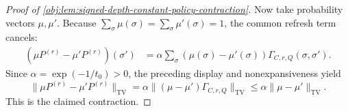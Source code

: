 \begin{proof}[Proof of \cref{obj:lem:signed-depth-constant-policy-contraction}]
Now take probability vectors \(\mu,\mu'\). Because \(\sum_\sigma\mu(\sigma)=\sum_\sigma\mu'(\sigma)=1\), the common refresh term cancels:
\[
\begin{aligned}
(\mu P^{(r)}-\mu'P^{(r)})(\sigma')
&=
\alpha\sum_{\sigma}
(\mu(\sigma)-\mu'(\sigma))\Gamma_{C,r,Q}(\sigma,\sigma') .
\end{aligned}
\]
Since \(\alpha=\exp(-1/t_0)>0\), the preceding display and nonexpansiveness yield
\[
\|\mu P^{(r)}-\mu'P^{(r)}\|_{\mathrm{TV}}
=
\alpha\|(\mu-\mu')\Gamma_{C,r,Q}\|_{\mathrm{TV}}
\le
\alpha\|\mu-\mu'\|_{\mathrm{TV}}.
\]
This is the claimed contraction. %
\end{proof}
